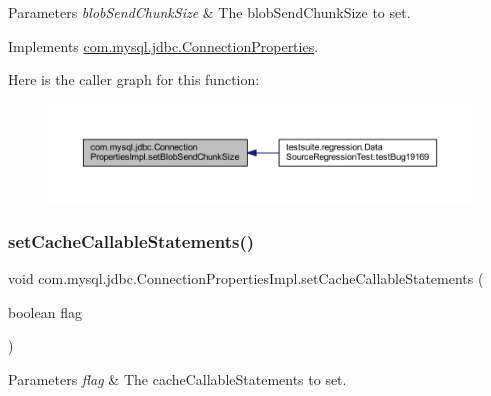 \begin{DoxyParams}{Parameters}
{\em blob\+Send\+Chunk\+Size} & The blob\+Send\+Chunk\+Size to set. \\
\hline
\end{DoxyParams}


Implements \mbox{\hyperlink{interfacecom_1_1mysql_1_1jdbc_1_1_connection_properties_ab16063397e021c5f18662127d274d4d5}{com.\+mysql.\+jdbc.\+Connection\+Properties}}.

Here is the caller graph for this function\+:\nopagebreak
\begin{figure}[H]
\begin{center}
\leavevmode
\includegraphics[width=350pt]{classcom_1_1mysql_1_1jdbc_1_1_connection_properties_impl_a7bf8ddcb8103feee679175048c14a6fc_icgraph}
\end{center}
\end{figure}
\mbox{\label{classcom_1_1mysql_1_1jdbc_1_1_connection_properties_impl_a2e984472e42c6ff984d1548c7ba919cb}} 
\subsubsection{\texorpdfstring{set\+Cache\+Callable\+Statements()}{setCacheCallableStatements()}}
{\footnotesize\ttfamily void com.\+mysql.\+jdbc.\+Connection\+Properties\+Impl.\+set\+Cache\+Callable\+Statements (\begin{DoxyParamCaption}\item[{boolean}]{flag }\end{DoxyParamCaption})}


\begin{DoxyParams}{Parameters}
{\em flag} & The cache\+Callable\+Statements to set. \\
\hline
\end{DoxyParams}


